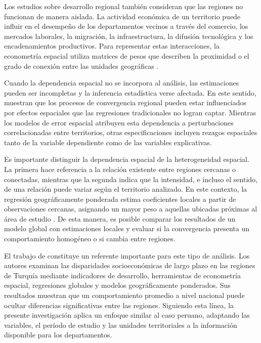 Los estudios sobre desarrollo regional también consideran que las regiones no
funcionan de manera aislada. La actividad económica de un territorio puede
influir en el desempeño de los departamentos vecinos a través del comercio, los
mercados laborales, la migración, la infraestructura, la difusión tecnológica y
los encadenamientos productivos. Para representar estas interacciones, la
econometría espacial utiliza matrices de pesos que describen la proximidad o el
grado de conexión entre las unidades geográficas
\parencite{anselin1988}.

Cuando la dependencia espacial no se incorpora al análisis, las estimaciones
pueden ser incompletas y la inferencia estadística verse afectada. En este
sentido, \textcite{rey_montouri1999} muestran que los procesos de convergencia
regional pueden estar influenciados por efectos espaciales que las regresiones
tradicionales no logran captar. Mientras los modelos de error espacial
atribuyen esta dependencia a perturbaciones correlacionadas entre territorios,
otras especificaciones incluyen rezagos espaciales tanto de la variable
dependiente como de las variables explicativas.

Es importante distinguir la dependencia espacial de la heterogeneidad espacial.
La primera hace referencia a la relación existente entre regiones cercanas o
conectadas, mientras que la segunda indica que la intensidad, e incluso el
sentido, de una relación puede variar según el territorio analizado. En este
contexto, la regresión geográficamente ponderada estima coeficientes locales a
partir de observaciones cercanas, asignando un mayor peso a aquellas ubicadas
próximas al área de estudio \parencite{fotheringham2002}. De esta manera, es
posible comparar los resultados de un modelo global con estimaciones locales y
evaluar si la convergencia presenta un comportamiento homogéneo o si cambia
entre regiones.

El trabajo de \textcite{duran2024} constituye un referente importante para este
tipo de análisis. Los autores examinan las disparidades socioeconómicas de largo
plazo en las regiones de Turquía mediante indicadores de desarrollo,
herramientas de econometría espacial, regresiones globales y modelos
geográficamente ponderados. Sus resultados muestran que un comportamiento
promedio a nivel nacional puede ocultar diferencias significativas entre las
regiones. Siguiendo esta línea, la presente investigación aplica un enfoque
similar al caso peruano, adaptando las variables, el período de estudio y las
unidades territoriales a la información disponible para los departamentos.

